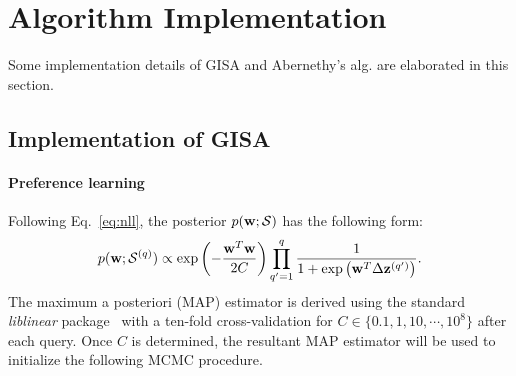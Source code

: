 \documentclass[onecolumn,11pt]{article}
\newcommand{\cutsectionup}{\vspace*{-0.1in}}
\newcommand{\cutsubsectionup}{\vspace*{-0.09in}}
\newcommand{\cutsectionup}{}
\newcommand{\cutsubsectionup}{}
\begin{document}
\cutsectionup
\section{Algorithm Implementation}
\label{sec:implementation}
Some implementation details of GISA and Abernethy's alg. are elaborated in this section. 
\cutsubsectionup
\subsection{Implementation of GISA}
\label{sec:implementationgisa}
\paragraph{Preference learning} Following Eq.~\eqref{eq:nll}, the posterior $p({\bf w};\mathcal{S})$ has the following form:
\begin{equation}
p({\bf w};\mathcal{S}^{(q)}) \propto \exp\left(-\frac{{\bf w}^T{\bf w}}{2C}\right) \prod_{q'=1}^{q} \frac{1}{1+\exp\left({\bf w}^T\Delta {\bf z}^{(q')}\right)}.
\label{eq:reglog}
\end{equation}
The maximum a posteriori (MAP) estimator is derived using the standard {\it liblinear} package~\cite{fan2008liblinear} with a ten-fold cross-validation for $C \in \{0.1,1,10,\cdots,10^8\}$ after each query. Once $C$ is determined, the resultant MAP estimator will be used to initialize the following MCMC procedure.
\end{document}
